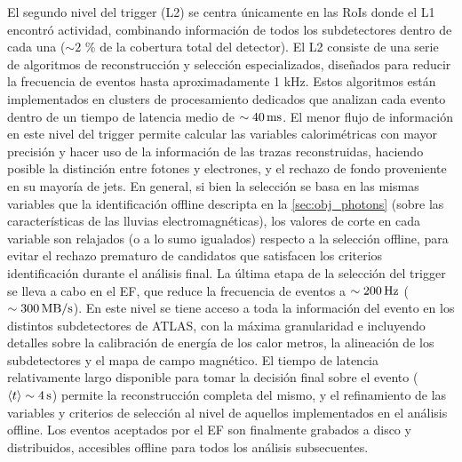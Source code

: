 El segundo nivel del trigger (L2) se centra únicamente en las RoIs donde el L1
encontró actividad, combinando información de todos los subdetectores dentro de
cada una ($\sim 2$ \% de la cobertura total del detector). El L2 consiste de una
serie de algoritmos de reconstrucción y selección especializados, dise\~nados
para reducir la frecuencia de eventos hasta aproximadamente 1 kHz. Estos
algoritmos están implementados en clusters de procesamiento dedicados
que analizan cada evento dentro de un tiempo de latencia medio de $\sim
\unit[40]{ms}$. El menor flujo de información en este nivel del trigger permite
calcular las variables calorimétricas con mayor precisión y hacer uso de la
información de las trazas reconstruidas, haciendo posible la distinción entre
fotones y electrones, y el rechazo de fondo proveniente en su mayoría de jets.
En general, si bien la selección se basa en las mismas variables que la
identificación offline descripta en la \cref{sec:obj_photons} (sobre las características de
las lluvias electromagnéticas), los valores de corte en cada variable son
relajados (o a lo sumo igualados) respecto a la selección offline, para evitar
el rechazo prematuro de candidatos que satisfacen los criterios identificación
durante el análisis final. La última etapa de la selección del trigger se lleva
a cabo en el EF, que reduce la frecuencia de eventos a $\sim
\unit[200]{Hz}$ ($\sim \unit[300]{MB/s}$). En este nivel se tiene acceso a toda
la información del evento en los distintos subdetectores de ATLAS, con la máxima
granularidad e incluyendo detalles sobre la calibración de energía de los
calor metros, la alineación de los subdetectores y el mapa de campo magnético. El
tiempo de latencia relativamente largo disponible para tomar la decisión final
sobre el evento ($\avg{t} \sim \unit[4]{s}$) permite la reconstrucción completa
del mismo, y el refinamiento de las variables y criterios de selección al nivel
de aquellos implementados en el análisis offline. Los eventos aceptados por el
EF son finalmente grabados a disco y distribuidos, accesibles offline para todos
los análisis subsecuentes.

